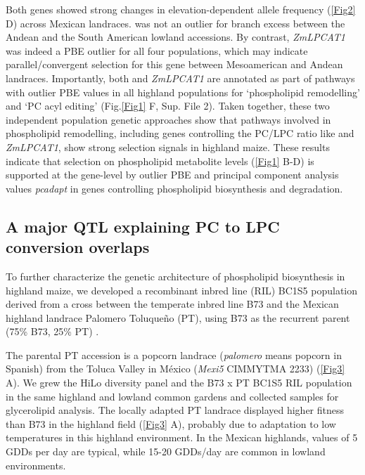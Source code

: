 Both genes showed strong changes in elevation-dependent allele frequency (\autoref{Fig2} D) across Mexican landraces.
\hpc was not an outlier for branch excess between the Andean and the South American lowland accessions.
By contrast, \textit{ZmLPCAT1} was indeed a PBE outlier for all four populations, which may indicate parallel/convergent selection for this gene between Mesoamerican and Andean landraces.
Importantly, both \hpc and \textit{ZmLPCAT1} are annotated as part of pathways with outlier PBE values in all highland populations for ‘phospholipid remodelling’ and ‘PC acyl editing’ (Fig.\autoref{Fig1} F, Sup. File 2). 
Taken together, these two independent population genetic approaches show that pathways involved in phospholipid remodelling,  including genes controlling the PC/LPC ratio like \hpc and \textit{ZmLPCAT1}, show strong selection signals in highland maize. 
These results indicate that selection on phospholipid metabolite levels (\autoref{Fig1} B-D) is supported at the gene-level by outlier PBE and principal component analysis values \textit{pcadapt} in genes controlling phospholipid biosynthesis and degradation.

\subsection{A major QTL explaining PC to LPC conversion overlaps \hpc}
To further characterize the genetic architecture of phospholipid biosynthesis in highland maize, we developed a recombinant inbred line (RIL) BC1S5 population derived from a cross between the temperate inbred line B73 and the Mexican highland landrace Palomero Toluqueño (PT), using B73 as the recurrent parent (75\% B73, 25\% PT) \citep{perez-limon2022}.

The parental PT accession is a popcorn landrace (\textit{palomero} means popcorn in Spanish) from the Toluca Valley in M\'exico (\textit{Mexi5} CIMMYTMA 2233) (\autoref{Fig3} A). 
We grew the HiLo diversity panel and the B73 x PT BC1S5 RIL population in the same highland and lowland common gardens and collected samples for glycerolipid analysis.
The locally adapted PT landrace displayed higher fitness than B73 in the highland field (\autoref{Fig3} A), probably due to adaptation to low temperatures in this highland environment.  
In the Mexican highlands, values of 5 GDDs per day are typical, while 15-20 GDDs/day are common in lowland environments. 


